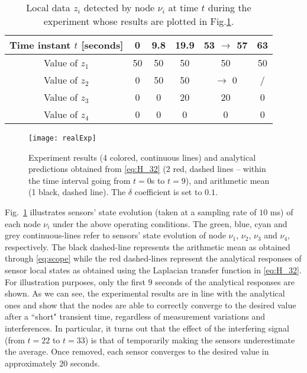 \documentclass[journal]{IEEEtran}
\begin{document}
{\begin{table}[t]
  \caption{Local data $z_i$ detected by node $\nu_i$ at time $t$ during the experiment whose results are plotted in Fig.\ref{fig:realExpPlot}.}
  \label{tbl:localData}
  \centering
  \begin{tabular}{| c || c | c | c | c | c |} 
  \hline   
 Time instant $t $ [seconds] & 0  & 9.8     & 19.9 & 53 $\rightarrow$ 57			& 63\\\hline
 \hline  
 Value of $z_1$& 50& 50     & 50 & 50			&50\\\hline
 Value of $z_2$&  0 & 	 50 & 50 & $\rightarrow$ 0& \slash \\\hline
 Value of $z_3$& 0  & 	 0   & 20 & 20			& 0\\\hline
 Value of $z_4$&  0 & 	 0   & 0   & 0			& 0\\
   \hline 
  \end{tabular}
\end{table} 
\begin{figure}
\centering
\texttt{[image: realExp]}
\caption{Experiment results (4 colored, continuous lines) and analytical predictions obtained from \eqref{eq:H_32} (2 red, dashed lines -- within the time interval going from $t=0$s to $t=9$), and arithmetic mean (1 black, dashed line). The $\delta$ coefficient is set to $0.1$. 
}
\label{fig:realExpPlot}
\end{figure}
Fig.~\ref{fig:realExpPlot} illustrates sensors' state  evolution (taken at a sampling rate of $10$ ms) of each node $\nu_i$ under the above operating conditions. The green, blue, cyan and grey continuous-lines refer to sensors' state  evolution of node $\nu_1$, $\nu_2$, $\nu_3$ and $\nu_4$, respectively.
{The black dashed-line represents the arithmetic mean as obtained through \eqref{eq:scope} while the red dashed-lines represent the analytical responses of sensor local states as obtained using the Laplacian transfer function in \eqref{eq:H_32}. For illustration purposes, only the first $9$ seconds of the analytical responses are shown. As we can see, the experimental results are in line with the analytical ones and show that the nodes are able to correctly converge to the desired value after a ``short" transient time, regardless of measurement variations and interferences. In particular, it turns out that the effect of the interfering signal (from $t=22$ to $t=33$) is that of temporarily making the sensors underestimate the average. Once removed, each sensor converges to the desired value in approximately $20$ seconds.}

}
\end{document}
